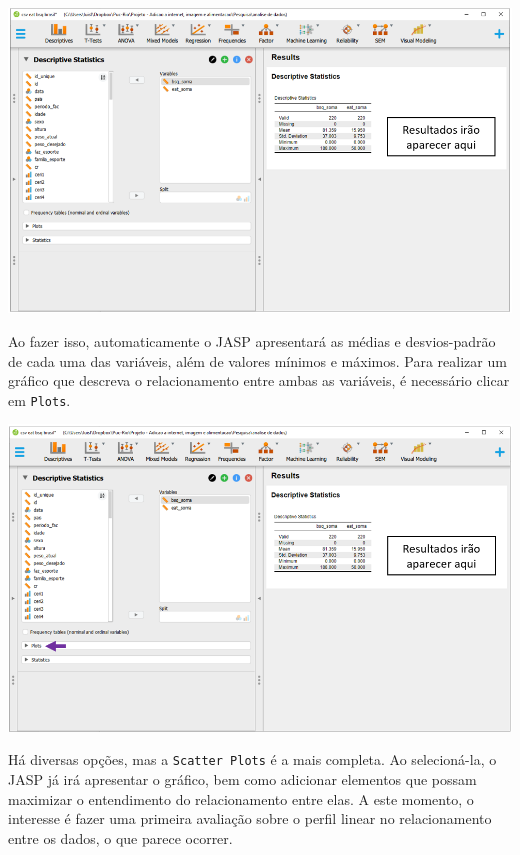 \documentclass[
]{book}
\begin{document}
\includegraphics{./img/cap_reg_descritivo.png}

Ao fazer isso, automaticamente o JASP apresentará as médias e desvios-padrão de cada uma das variáveis, além de valores mínimos e máximos. Para realizar um gráfico que descreva o relacionamento entre ambas as variáveis, é necessário clicar em \texttt{Plots}.

\includegraphics{./img/cap_reg_plot.png}

Há diversas opções, mas a \texttt{Scatter\ Plots} é a mais completa. Ao selecioná-la, o JASP já irá apresentar o gráfico, bem como adicionar elementos que possam maximizar o entendimento do relacionamento entre elas. A este momento, o interesse é fazer uma primeira avaliação sobre o perfil linear no relacionamento entre os dados, o que parece ocorrer.
\end{document}
